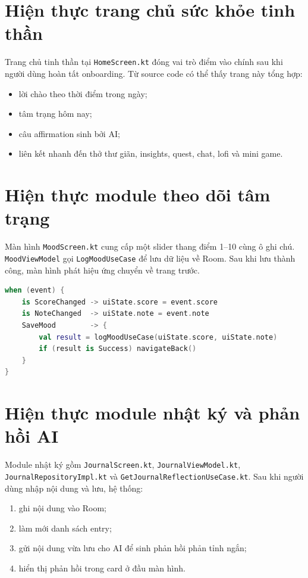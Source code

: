 \documentclass{zenbuddy-report}
\begin{document}
\section{Hiện thực trang chủ sức khỏe tinh thần}
Trang chủ tinh thần tại \texttt{HomeScreen.kt} đóng vai trò điểm vào chính sau khi người dùng hoàn tất onboarding. Từ source code có thể thấy trang này tổng hợp:
\begin{itemize}
  \item lời chào theo thời điểm trong ngày;
  \item tâm trạng hôm nay;
  \item câu affirmation sinh bởi AI;
  \item liên kết nhanh đến thở thư giãn, insights, quest, chat, lofi và mini game.
\end{itemize}


\section{Hiện thực module theo dõi tâm trạng}
Màn hình \texttt{MoodScreen.kt} cung cấp một slider thang điểm 1--10 cùng ô ghi chú. \texttt{MoodViewModel} gọi \texttt{LogMoodUseCase} để lưu dữ liệu về Room. Sau khi lưu thành công, màn hình phát hiệu ứng chuyển về trang trước.

\begin{lstlisting}[language=Kotlin,caption={Pseudocode lưu tâm trạng},label={lst:save-mood}]
when (event) {
    is ScoreChanged -> uiState.score = event.score
    is NoteChanged  -> uiState.note = event.note
    SaveMood        -> {
        val result = logMoodUseCase(uiState.score, uiState.note)
        if (result is Success) navigateBack()
    }
}
\end{lstlisting}


\section{Hiện thực module nhật ký và phản hồi AI}
Module nhật ký gồm \texttt{JournalScreen.kt}, \texttt{JournalViewModel.kt}, \texttt{JournalRepositoryImpl.kt} và \texttt{GetJournalReflectionUseCase.kt}. Sau khi người dùng nhập nội dung và lưu, hệ thống:
\begin{enumerate}
  \item ghi nội dung vào Room;
  \item làm mới danh sách entry;
  \item gửi nội dung vừa lưu cho AI để sinh phản hồi phản tỉnh ngắn;
  \item hiển thị phản hồi trong card ở đầu màn hình.
\end{enumerate}
\end{document}

